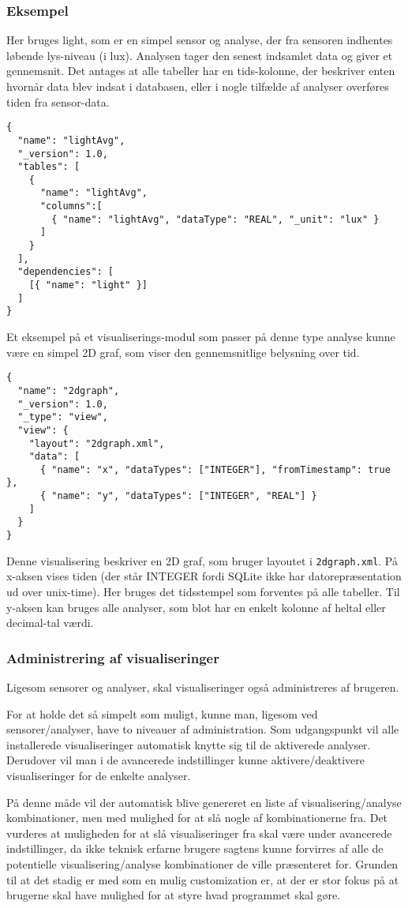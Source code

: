 \subsubsection{Eksempel}
Her bruges light, som er en simpel sensor og analyse, der fra sensoren indhentes løbende lys-niveau (i lux).
Analysen tager den senest indsamlet data og giver et gennemsnit.
Det antages at alle tabeller har en tids-kolonne, der beskriver enten hvornår data blev indsat i databasen, eller i nogle tilfælde af analyser overføres tiden fra sensor-data.

\begin{lstlisting}
{
  "name": "lightAvg",
  "_version": 1.0,
  "tables": [
    {
      "name": "lightAvg",
      "columns":[
        { "name": "lightAvg", "dataType": "REAL", "_unit": "lux" }
      ]
    }
  ],
  "dependencies": [
    [{ "name": "light" }]
  ]
}
\end{lstlisting}

Et eksempel på et visualiserings-modul som passer på denne type analyse kunne være en simpel 2D graf, som viser den gennemsnitlige belysning over tid.

\begin{lstlisting}
{
  "name": "2dgraph",
  "_version": 1.0,
  "_type": "view",
  "view": {
    "layout": "2dgraph.xml",
    "data": [
      { "name": "x", "dataTypes": ["INTEGER"], "fromTimestamp": true },
      { "name": "y", "dataTypes": ["INTEGER", "REAL"] }
    ]
  }
}
\end{lstlisting}
 
Denne visualisering beskriver en 2D graf, som bruger layoutet i \texttt{2dgraph.xml}.
På x-aksen vises tiden (der står INTEGER fordi SQLite ikke har datorepræsentation ud over unix-time).
Her bruges det tidsstempel som forventes på alle tabeller.
Til y-aksen kan bruges alle analyser, som blot har en enkelt kolonne af heltal eller decimal-tal værdi.

\subsubsection{Administrering af visualiseringer}
Ligesom sensorer og analyser, skal visualiseringer også administreres af brugeren.

For at holde det så simpelt som muligt, kunne man, ligesom ved sensorer/analyser, have to niveauer af administration.
Som udgangspunkt vil alle installerede visualiseringer automatisk knytte sig til de aktiverede analyser.
Derudover vil man i de avancerede indstillinger kunne aktivere/deaktivere visualiseringer for de enkelte analyser.

På denne måde vil der automatisk blive genereret en liste af visualisering/analyse kombinationer, men med mulighed for at slå nogle af kombinationerne fra.
Det vurderes at muligheden for at slå visualiseringer fra skal være under avancerede indstillinger, da ikke teknisk erfarne brugere sagtens kunne forvirres af alle de potentielle visualisering/analyse kombinationer de ville præsenteret for.
Grunden til at det stadig er med som en mulig customization er, at der er stor fokus på at brugerne skal have mulighed for at styre hvad programmet skal gøre. 
